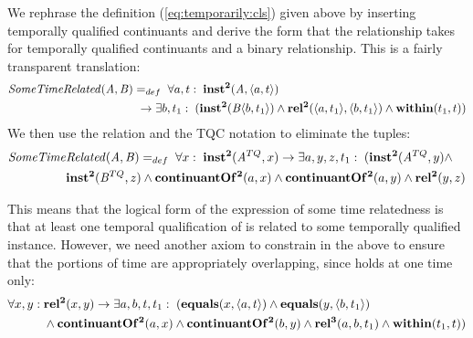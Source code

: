 We rephrase the definition (\ref{eq:temporarily:cls}) given above by inserting
temporally qualified continuants and derive the form that the relationship takes
for temporally qualified continuants and a binary relationship. This is a fairly
transparent translation:
\begin{equation}
\begin{split}
\mathit{SomeTimeRelated}(\mathit{A},\mathit{B})& =_{def}\;
\forall a, t:\; \mathrm{\mathbf{inst^2}}(\mathit{A}, \langle a,t\rangle) \\
&\ \rightarrow
\exists b, t_1:\;(\mathrm{\mathbf{inst^2}}(\mathit{B}\langle b,t_1\rangle) \wedge
\mathrm{\mathbf{rel^2}}(\langle a,t_1\rangle,\langle b,t_1\rangle) \wedge \mathrm{\mathbf{within}}(t_1,t))
\end{split}
\end{equation}
We then use the  relation and the TQC notation to eliminate
the tuples:
\begin{equation}
\begin{split}
\mathit{SomeTime}&\mathit{Related}(\mathit{A},\mathit{B}) =_{def}\;
\forall x:\; \mathrm{\mathbf{inst^2}}(\mathit{A}^{TQ}, x)
 \rightarrow
\exists a,y,z,t_1:\;(\mathrm{\mathbf{inst^2}}(\mathit{A}^{TQ},y) \wedge \\ & \mathrm{\mathbf{inst^2}}(\mathit{B}^{TQ},z)
 \wedge \mathrm{\mathbf{continuantOf^2}}(a,x) \wedge \mathrm{\mathbf{continuantOf^2}}(a,y) \wedge
\mathrm{\mathbf{rel^2}}(y,z)
\end{split}
\label{eq:usesSame}
\end{equation}


This means that the logical form of the expression of some time relatedness is that
at least one temporal qualification of  is related to some temporally
qualified  instance.
However, we need another axiom to constrain  in the above to ensure that the
portions of time are appropriately overlapping, since  holds at one time
only:
\begin{equation}
\begin{split}
\forall x,y:\;& \mathrm{\mathbf{rel^2}}(x,y) \rightarrow \exists a,b,t,t_1:\;
(\mathrm{\mathbf{equals}}(x,\langle a,t\rangle)\wedge \mathrm{\mathbf{equals}}(y,\langle b,t_1\rangle)\\
& \wedge \mathrm{\mathbf{continuantOf^2}}(a,x) \wedge \mathrm{\mathbf{continuantOf^2}}(b,y) \wedge
\mathrm{\mathbf{rel^3}}(a,b,t_1) \wedge \mathrm{\mathbf{within}}(t_1,t))
\end{split}
\end{equation}

